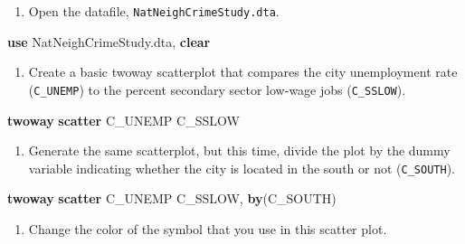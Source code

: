 \documentclass[
]{book}
\newenvironment{Shaded}{\begin{snugshade}}{\end{snugshade}}
\newcommand{\KeywordTok}[1]{\textcolor[rgb]{0.13,0.29,0.53}{\textbf{#1}}}
\newcommand{\NormalTok}[1]{#1}
\providecommand{\tightlist}{%
  \setlength{\itemsep}{0pt}\setlength{\parskip}{0pt}}
\begin{document}
\begin{alert}

\begin{enumerate}
\def\labelenumi{\arabic{enumi}.}
\tightlist
\item
  Open the datafile, \texttt{NatNeighCrimeStudy.dta}.
\end{enumerate}

\begin{Shaded}
\begin{Highlighting}[]
\KeywordTok{use}\NormalTok{ NatNeighCrimeStudy.dta, }\KeywordTok{clear}
\end{Highlighting}
\end{Shaded}

\begin{enumerate}
\def\labelenumi{\arabic{enumi}.}
\setcounter{enumi}{1}
\tightlist
\item
  Create a basic twoway scatterplot that compares the city unemployment rate (\texttt{C\_UNEMP}) to the percent secondary sector low-wage jobs (\texttt{C\_SSLOW}).
\end{enumerate}

\begin{Shaded}
\begin{Highlighting}[]
\KeywordTok{twoway} \KeywordTok{scatter}\NormalTok{ C\_UNEMP C\_SSLOW}
\end{Highlighting}
\end{Shaded}

\begin{enumerate}
\def\labelenumi{\arabic{enumi}.}
\setcounter{enumi}{2}
\tightlist
\item
  Generate the same scatterplot, but this time, divide the plot by the dummy variable indicating whether the city is located in the south or not (\texttt{C\_SOUTH}).
\end{enumerate}

\begin{Shaded}
\begin{Highlighting}[]
\KeywordTok{twoway} \KeywordTok{scatter}\NormalTok{ C\_UNEMP C\_SSLOW, }\KeywordTok{by}\NormalTok{(C\_SOUTH)}
\end{Highlighting}
\end{Shaded}

\begin{enumerate}
\def\labelenumi{\arabic{enumi}.}
\setcounter{enumi}{3}
\tightlist
\item
  Change the color of the symbol that you use in this scatter plot.
\end{enumerate}


\end{alert}
\end{document}
